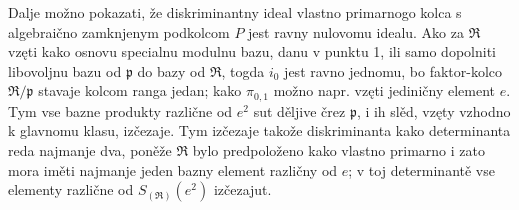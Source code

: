 \documentclass[11pt]{article}
\begin{document}
\setcounter{footnote}{27}

Dalje možno pokazati, že diskriminantny ideal vlastno primarnogo kolca s algebraično zamknjenym podkolcom $P$ jest ravny nulovomu idealu. Ako za $\mathfrak R$ vzęti kako osnovu specialnu modulnu bazu, danu v punktu 1, ili samo dopolniti libovoljnu bazu od $\mathfrak p$ do bazy od $\mathfrak R$, togda $i_0$ jest ravno jednomu, bo faktor-kolco $\mathfrak R/\mathfrak p$ stavaje kolcom ranga jedan; kako $\pi_{0,1}$ možno napr. vzęti jediničny element $e$. Tym vse bazne produkty različne od $e^2$ sut děljive črez $\mathfrak p$, i ih slěd, vzęty vzhodno k glavnomu klasu, izčezaje. Tym izčezaje takože diskriminanta kako determinanta reda najmanje dva, poněže $\mathfrak R$ bylo predpoloženo kako vlastno primarno i zato mora iměti najmanje jeden bazny element različny od $e$; v toj determinantě vse elementy različne od $S_{(\mathfrak R)}(e^2)$ izčezajut.
\end{document}
